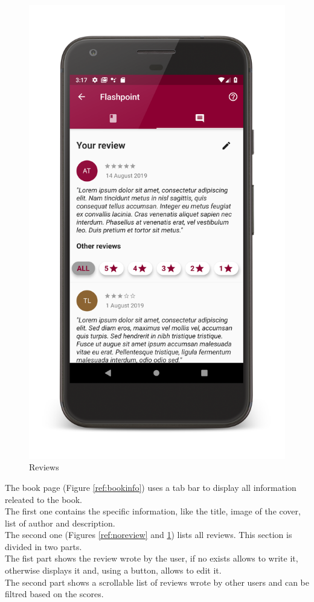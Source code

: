 \begin{figure}[!htb]
\begin{minipage}[b]{0.3\textwidth}
        \includegraphics[scale=0.09]{images/reviews-page.png}
        \caption{Reviews}
        \label{ref:reviewspage}
    \end{minipage}
\end{figure}
The book page (Figure \ref{ref:bookinfo}) uses a tab bar to display all information releated to the book.\\ 
The first one contains the specific information, like the title, image of the cover, list of author and description.\\ 
The second one (Figures \ref{ref:noreview} and \ref{ref:reviewspage}) lists all reviews. This section is divided in two parts.\\
The fist part shows the review wrote by the user, if no exists allows to write it, otherwise displays it and, using a button, allows to edit it.\\
The second part shows a scrollable list of reviews wrote by other users and can be filtred based on the scores.
\clearpage
